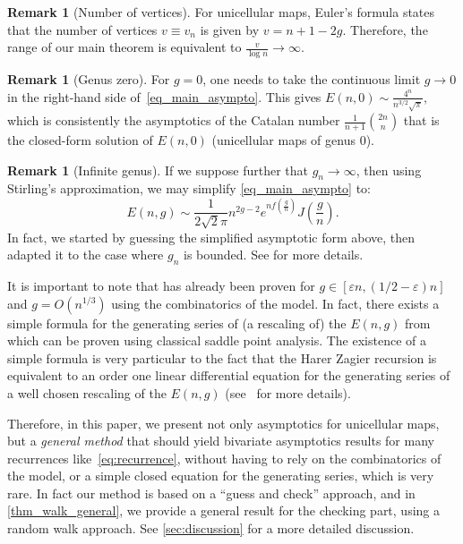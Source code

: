 \documentclass[a4paper,12pt]{article}
\theoremstyle{definition}
\newtheorem{remark}[theorem]{Remark}
\newcommand{\eps}{\varepsilon}
\newcommand{\E}{E}
\begin{document}
\begin{remark}[Number of vertices]\label{rem_vertices}
  For unicellular maps, Euler's formula states that the number of vertices $v \equiv v_n$ is given by $v = n + 1 - 2g$. 
  Therefore, the range of our main theorem is equivalent to $\frac{v}{\log n} \to \infty$.
\end{remark}

\begin{remark}[Genus zero]\label{rem_g0}
  For $g=0$, one needs to take the continuous limit $g\rightarrow 0$ in the right-hand side of~\eqref{eq_main_asympto}. This gives
  $\E(n,0)\sim \frac{4^n}{n^{3/2}\sqrt{\pi}},$
  which is consistently the asymptotics of the Catalan number $\frac{1}{n+1}\binom{2n}{n}$ that is the closed-form solution of $E(n,0)$ (unicellular maps of genus $0$). 
\end{remark}

\begin{remark}[Infinite genus]\label{rem:g-infinite}
  If we suppose further that $g_n \to \infty$, then using Stirling's approximation, we may simplify \eqref{eq_main_asympto} to:
  \[
    \E(n,g) \sim \frac{1}{2\sqrt{2}\pi} n^{2g-2} e^{n f(\frac{g}{n})} {J}\left(\frac{g}{n}\right).
  \]
  In fact, we started by guessing the simplified asymptotic form above, then adapted it to the case where $g_n$ is bounded. See  for more details.
\end{remark}

It is important to note that  has already been proven for $g\in[\eps n,(1/2-\eps)n]$ \cite{linear-genus} and $g=O(n^{1/3})$ \cite[Corollary~4]{meso-genus} using the combinatorics of the model. In fact, there exists a simple formula for the generating series of (a rescaling of) the $E(n,g)$ from which  can be proven using classical saddle point analysis. The existence of a simple formula is very particular to the fact that the Harer Zagier recursion is equivalent to an order one linear differential equation for the generating series of a well chosen rescaling of the $E(n,g)$ (see~ for more details).

Therefore, in this paper, we present not only asymptotics for unicellular maps, but a \emph{general method} that should yield bivariate asymptotics results for many recurrences like~\eqref{eq:recurrence}, without having to rely on the combinatorics of the model, or a simple closed equation for the generating series, which is very rare. In fact our method is based on a ``guess and check'' approach, and in \cref{thm_walk_general}, we provide a general result for the checking part, using a random walk approach. See \cref{sec:discussion} for a more detailed discussion.
\end{document}
